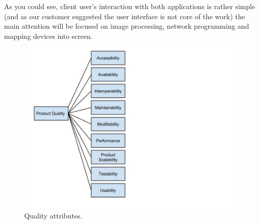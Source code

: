 As you could see, client user's interaction with both applications is rather simple (and as our customer suggested the user interface is not core of the work) the main attention will be focused on image processing, network programming and mapping devices into screen.

\begin{figure}[!ht]
    \begin{center}
    \includegraphics[scale=0.4]{images/qualityAttributes.jpg}
    \caption{Quality attributes.}
    \label{img:qualityAttributes}
    \end{center}
\end{figure}